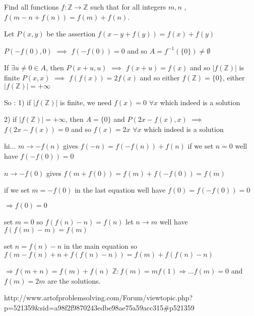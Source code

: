 \begin{solution}
	\begin{tcolorbox}Find all functions $f: \mathbb{Z}\to\mathbb{Z}$ such that for all integers $m,n$ ,  $f(m-n+f(n))=f(m)+f(n)$.\end{tcolorbox}
Let $P(x,y)$ be the assertion $f(x-y+f(y))=f(x)+f(y)$

$P(-f(0),0)$ $\implies$  $f(-f(0))=0$ and so $A=f^{-1}(\{0\})\ne \emptyset$

If $\exists u\ne 0\in A$, then $P(x+u,u)$ $\implies$ $f(x+u)=f(x)$ and so $|f(\mathbb Z)|$ is finite
$P(x,x)$ $\implies$ $f(f(x))=2f(x)$ and so either $f(\mathbb Z)=\{0\}$, either $|f(\mathbb Z)|=+\infty$


So :
1) if $|f(\mathbb Z)|$ is finite, we need $\boxed{f(x)=0}$ $\forall x$ which indeed is a solution

2) if $|f(\mathbb Z)|=+\infty$, then $A=\{0\}$ and $P(2x-f(x),x)$ $\implies$ $f(2x-f(x))=0$ and so $\boxed{f(x)=2x}$ $\forall x$ which indeed is a solution
\end{solution}



\begin{solution}
	hi...
$m\rightarrow -f(n)$  gives $f(-n)=f(-f(n))+f(n)$ if we set $n=0$ well have $f(-f(0))=0$

$n\rightarrow -f(0)$   gives $f(m+f(0))=f(m)+f(-f(0))=f(m) $

if we set $m=-f(0)$ in the last equation well have $f(0)=f(-f(0))=0$ 

$\Rightarrow  f(0)=0$

set $m=0$  so $f(f(n)-n)=f(n)$ let $n \rightarrow m$ well have $f(f(m)-m)=f(m)$

set $n=f(n)-n$ in the main equation so $f(m-f(n)+n+f(f(n)-n))=f(m)+f(f(n)-n)$

$\Rightarrow f(m+n)=f(m)+f(n)$  $\mathbb{Z} : f(m)=mf(1) \Rightarrow ... f(m)=0$ and $f(m)=2m$ are the solutions.
\end{solution}



\begin{solution}
	http://www.artofproblemsolving.com/Forum/viewtopic.php?p=521359&sid=a98f2f9870243edbe98ae75a59acc315#p521359
\end{solution}



